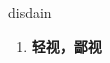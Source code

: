 
\begin{frame}
{\huge disdain}
\begin{center}
\begin{enumerate}\Large
  \item \textbf{轻视，鄙视}
\end{enumerate}
\end{center}
\end{frame}
